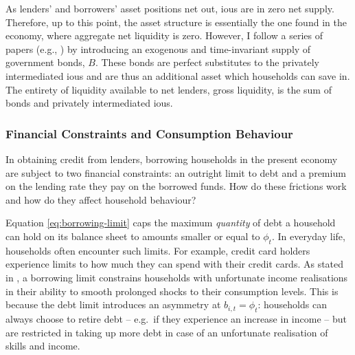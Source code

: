 \documentclass[a4paper,12pt]{article} %
\numberwithin{equation}{section} %
\numberwithin{figure}{section}
\numberwithin{table}{section}
\begin{document}
As lenders' and borrowers' asset positions net out, \Gls{iou}s are in zero net supply. Therefore, up to this point, the asset structure is essentially the one found in the \textcite{huggett1993} economy, where aggregate net liquidity is zero. However, I follow a series of papers (e.g.\cite{gl2017}, \cite{bayer2023}) by introducing an exogenous and time-invariant supply of government bonds, $B$. These bonds are perfect substitutes to the privately intermediated \Gls{iou}s and are thus an additional asset which households can save in. The entirety of liquidity available to net lenders, gross liquidity, is the sum of bonds and privately intermediated \Gls{iou}s.



\subsubsection{Financial Constraints and Consumption Behaviour}
\label{sec:model-hh-constraints}

In obtaining credit from lenders, borrowing households in the present economy are subject to two financial constraints: an outright limit to debt and a premium on the lending rate they pay on the borrowed funds. How do these frictions work and how do they affect household behaviour?

Equation \eqref{eq:borrowing-limit} caps the maximum \textit{quantity} of debt a household can hold on its balance sheet to amounts smaller or equal to $\phi_t$. In everyday life, households often encounter such limits. For example, credit card holders experience limits to how much they can spend with their credit cards. As stated in \textcite{carroll2021}, a borrowing limit constrains households with unfortunate income realisations in their ability to smooth prolonged shocks to their consumption levels. This is because the debt limit introduces an asymmetry at $b_{i,t} = \phi_t$: households can always choose to retire debt -- e.g.~if they experience an increase in income -- but are restricted in taking up more debt in case of an unfortunate realisation of skills and income. 
\end{document}
